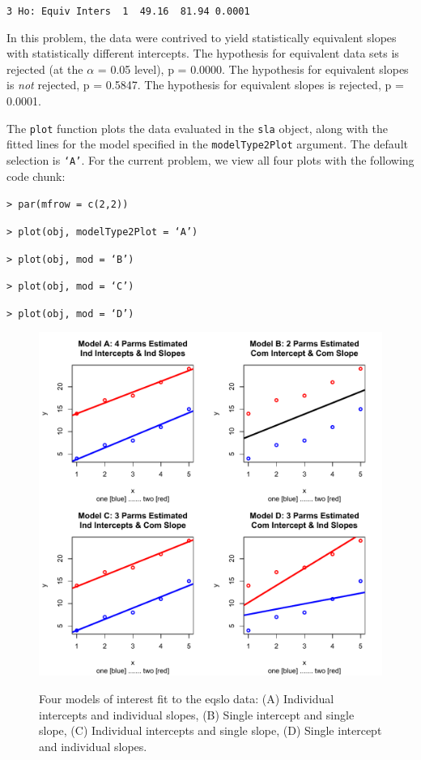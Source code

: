 \documentclass[11pt, oneside]{article}   	%
\begin{document}
\noindent \texttt{3 Ho: Equiv Inters~  1~  49.16~  81.94 0.0001   }

\vspace{2 mm} 

In this problem, the data were contrived to yield statistically equivalent slopes with statistically different intercepts.  The hypothesis for equivalent data sets is rejected (at the $ \alpha $ = 0.05  level), p = 0.0000.  The hypothesis for equivalent slopes is \emph{not} rejected, p = 0.5847.  The hypothesis for equivalent slopes is rejected, p = 0.0001.  

\vspace{2 mm}

\noindent The \texttt{plot} function plots the data evaluated in the \texttt{sla} object, along with the fitted lines for the model specified in the  \texttt{modelType2Plot} argument.  The default selection is  \texttt{`A'}.  For the current problem, we view all four plots with the following code chunk:

\vspace{2 mm}          

\noindent \texttt{> par(mfrow = c(2,2))}

\noindent \texttt{> plot(obj, modelType2Plot = `A')}

\noindent \texttt{> plot(obj, mod = `B')}

\noindent \texttt{> plot(obj, mod = `C')}

\noindent \texttt{> plot(obj, mod = `D')}

\begin{center} 
\begin{figure}
\includegraphics[scale = 0.90]{eqsloABCD.pdf} 
\label{Fig. 2}
\caption{Four models of interest fit to the eqslo data: (A) Individual intercepts and individual slopes, (B) Single intercept and single slope, (C) Individual intercepts and single slope, (D) Single intercept and individual slopes.}
\end{figure}
\end{center}
\end{document}
